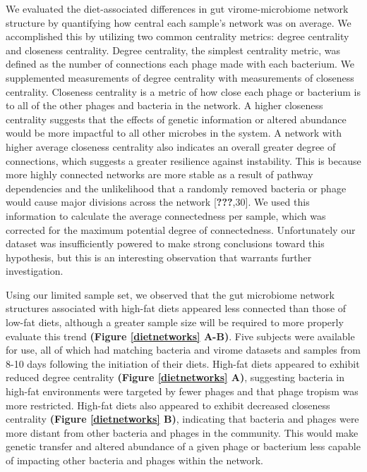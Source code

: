 \documentclass[12pt,]{article}
\begin{document}
We evaluated the diet-associated differences in gut virome-microbiome
network structure by quantifying how central each sample's network was
on average. We accomplished this by utilizing two common centrality
metrics: degree centrality and closeness centrality. Degree centrality,
the simplest centrality metric, was defined as the number of connections
each phage made with each bacterium. We supplemented measurements of
degree centrality with measurements of closeness centrality. Closeness
centrality is a metric of how close each phage or bacterium is to all of
the other phages and bacteria in the network. A higher closeness
centrality suggests that the effects of genetic information or altered
abundance would be more impactful to all other microbes in the system. A
network with higher average closeness centrality also indicates an
overall greater degree of connections, which suggests a greater
resilience against instability. This is because more highly connected
networks are more stable as a result of pathway dependencies and the
unlikelihood that a randomly removed bacteria or phage would cause major
divisions across the network {[}{\textbf{???}},30{]}. We used this
information to calculate the average connectedness per sample, which was
corrected for the maximum potential degree of connectedness.
Unfortunately our dataset was insufficiently powered to make strong
conclusions toward this hypothesis, but this is an interesting
observation that warrants further investigation.

Using our limited sample set, we observed that the gut microbiome
network structures associated with high-fat diets appeared less
connected than those of low-fat diets, although a greater sample size
will be required to more properly evaluate this trend \textbf{(Figure
\ref{dietnetworks} A-B)}. Five subjects were available for use, all of
which had matching bacteria and virome datasets and samples from 8-10
days following the initiation of their diets. High-fat diets appeared to
exhibit reduced degree centrality \textbf{(Figure \ref{dietnetworks}
A)}, suggesting bacteria in high-fat environments were targeted by fewer
phages and that phage tropism was more restricted. High-fat diets also
appeared to exhibit decreased closeness centrality \textbf{(Figure
\ref{dietnetworks} B)}, indicating that bacteria and phages were more
distant from other bacteria and phages in the community. This would make
genetic transfer and altered abundance of a given phage or bacterium
less capable of impacting other bacteria and phages within the network.
\end{document}
